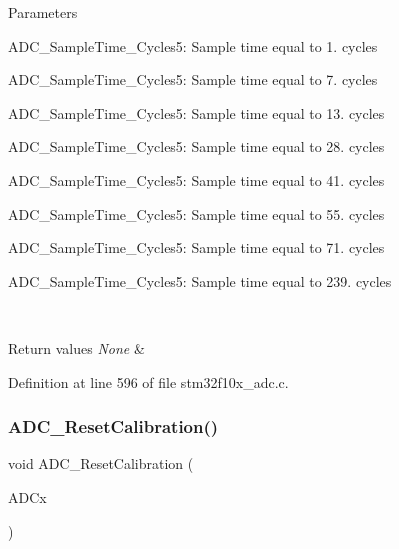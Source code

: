 \begin{DoxyParams}{Parameters}
\begin{DoxyItemize}
\item A\+D\+C\+\_\+\+Sample\+Time\+\_\+Cycles5\+: Sample time equal to 1. cycles \item A\+D\+C\+\_\+\+Sample\+Time\+\_\+Cycles5\+: Sample time equal to 7. cycles \item A\+D\+C\+\_\+\+Sample\+Time\+\_\+Cycles5\+: Sample time equal to 13. cycles \item A\+D\+C\+\_\+\+Sample\+Time\+\_\+Cycles5\+: Sample time equal to 28. cycles \item A\+D\+C\+\_\+\+Sample\+Time\+\_\+Cycles5\+: Sample time equal to 41. cycles \item A\+D\+C\+\_\+\+Sample\+Time\+\_\+Cycles5\+: Sample time equal to 55. cycles \item A\+D\+C\+\_\+\+Sample\+Time\+\_\+Cycles5\+: Sample time equal to 71. cycles \item A\+D\+C\+\_\+\+Sample\+Time\+\_\+Cycles5\+: Sample time equal to 239. cycles \end{DoxyItemize}
\\
\hline
\end{DoxyParams}

\begin{DoxyRetVals}{Return values}
{\em None} & \\
\hline
\end{DoxyRetVals}


Definition at line 596 of file stm32f10x\+\_\+adc.\+c.

\mbox{\label{group___a_d_c___exported___functions_ga3d542020ba28c1d16238a0defbee6d8f}} 
\subsubsection{\texorpdfstring{A\+D\+C\+\_\+\+Reset\+Calibration()}{ADC\_ResetCalibration()}}
{\footnotesize\ttfamily void A\+D\+C\+\_\+\+Reset\+Calibration (\begin{DoxyParamCaption}\item[{\hyperlink{struct_a_d_c___type_def}{A\+D\+C\+\_\+\+Type\+Def} $\ast$}]{A\+D\+Cx }\end{DoxyParamCaption})}



